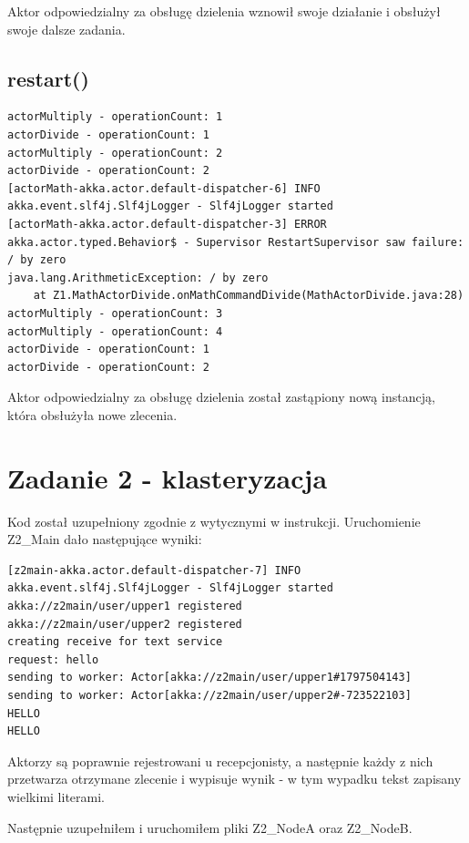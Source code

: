 \documentclass[12pt]{article}
\begin{document}
Aktor odpowiedzialny za obsługę dzielenia wznowił swoje działanie i obsłużył swoje dalsze zadania.

\newpage
\subsection{restart()}
\begin{verbatim}
actorMultiply - operationCount: 1
actorDivide - operationCount: 1
actorMultiply - operationCount: 2
actorDivide - operationCount: 2
[actorMath-akka.actor.default-dispatcher-6] INFO akka.event.slf4j.Slf4jLogger - Slf4jLogger started
[actorMath-akka.actor.default-dispatcher-3] ERROR akka.actor.typed.Behavior$ - Supervisor RestartSupervisor saw failure: / by zero
java.lang.ArithmeticException: / by zero
	at Z1.MathActorDivide.onMathCommandDivide(MathActorDivide.java:28)
actorMultiply - operationCount: 3
actorMultiply - operationCount: 4
actorDivide - operationCount: 1
actorDivide - operationCount: 2

\end{verbatim}

Aktor odpowiedzialny za obsługę dzielenia został zastąpiony nową instancją, która obsłużyła nowe zlecenia.

\section{Zadanie 2 - klasteryzacja}
Kod został uzupełniony zgodnie z wytycznymi w instrukcji. Uruchomienie Z2\_Main dało następujące wyniki:
\begin{verbatim}
[z2main-akka.actor.default-dispatcher-7] INFO akka.event.slf4j.Slf4jLogger - Slf4jLogger started
akka://z2main/user/upper1 registered
akka://z2main/user/upper2 registered
creating receive for text service
request: hello
sending to worker: Actor[akka://z2main/user/upper1#1797504143]
sending to worker: Actor[akka://z2main/user/upper2#-723522103]
HELLO
HELLO
\end{verbatim}

Aktorzy są poprawnie rejestrowani u recepcjonisty, a następnie każdy z nich przetwarza otrzymane zlecenie i wypisuje wynik - w tym wypadku tekst zapisany wielkimi literami.

Następnie uzupełniłem i uruchomiłem pliki Z2\_NodeA oraz Z2\_NodeB.
\end{document}
